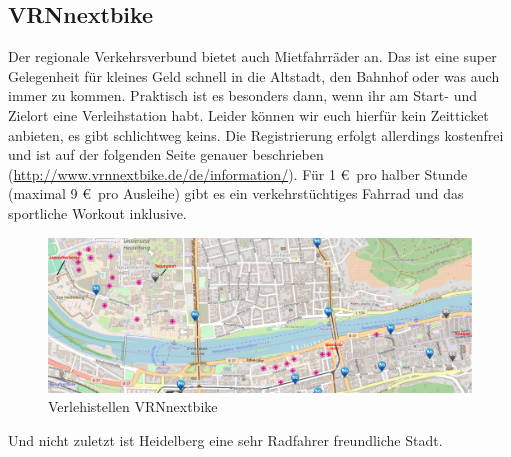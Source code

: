   \subsection{VRNnextbike}
    Der regionale Verkehrsverbund bietet auch Mietfahrräder an. Das ist eine super Gelegenheit
    für kleines Geld schnell in die Altstadt, den Bahnhof oder was auch immer zu kommen.
    Praktisch ist es besonders dann, wenn ihr am Start- und Zielort eine Verleihstation habt.
    Leider können wir euch hierfür kein Zeitticket anbieten, es gibt schlichtweg keins.
    Die Registrierung erfolgt allerdings kostenfrei und ist auf der folgenden Seite
    genauer beschrieben (\url{http://www.vrnnextbike.de/de/information/}).
    Für 1 \euro \, pro halber Stunde (maximal 9 \euro \, pro Ausleihe) gibt es ein verkehrstüchtiges
    Fahrrad und das sportliche Workout inklusive.

    \begin{figure}
      \includegraphics[width=1.0\textwidth]{chapters/heidelberg/nextbike}
      \caption{Verlehistellen VRNnextbike}
      \label{nextbike}
    \end{figure}

    Und nicht zuletzt ist Heidelberg eine sehr Radfahrer freundliche Stadt.
